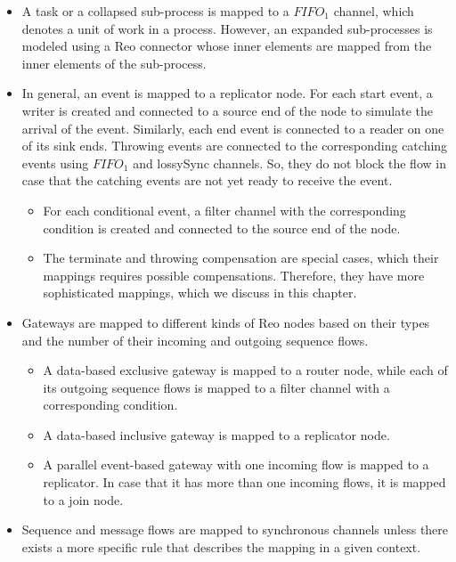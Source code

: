 \begin{itemize}
 \item A task or a collapsed sub-process is mapped to a $FIFO_1$ channel, which denotes a unit of work in a process. However, an  expanded sub-processes is modeled using a Reo connector whose inner elements are mapped from the inner elements of the sub-process.
 
 \item In general, an event is mapped to a replicator node. For each start event, a writer is created and connected to a source end of the node to simulate the arrival of the event. Similarly, each end event is connected to a reader on one of its sink ends. Throwing events are connected to the corresponding catching events using $FIFO_1$ and lossySync channels. So, they do not block the flow in case that the catching events are not yet ready to receive the event.
 \begin{itemize}
               \item For each conditional event, a filter channel with the corresponding condition is created and connected to the source end of the node. %
               \item The terminate and throwing compensation are special cases, which their mappings requires possible compensations. Therefore, they have more sophisticated mappings, which we discuss in this chapter. %
\end{itemize}

 \item Gateways are mapped to different kinds of Reo nodes based on their types and the number of their incoming and outgoing sequence flows.
 \begin{itemize}
  \item A data-based exclusive gateway is mapped to a router node, while each of its outgoing sequence flows is mapped to a filter channel with a corresponding condition.  
  \item A data-based inclusive gateway is mapped to a replicator node.  
  \item A parallel event-based gateway with one incoming flow is mapped to a replicator. In case that it has more than one incoming flows, it is mapped to a join node.
\end{itemize}

 \item Sequence and message flows are mapped to synchronous channels unless there exists a more specific rule that describes the mapping in a given context. %
\end{itemize}

